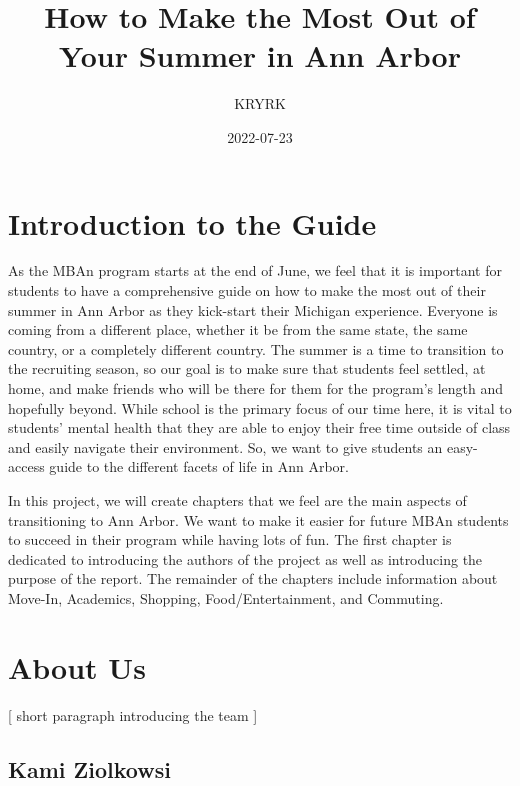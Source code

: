 \documentclass[
]{book}
\title{How to Make the Most Out of Your Summer in Ann Arbor}
\author{KRYRK}
\date{2022-07-23}
\begin{document}
\maketitle

{
\setcounter{tocdepth}{1}
\tableofcontents
}
\hypertarget{introduction-to-the-guide}{%
\chapter*{Introduction to the Guide}\label{introduction-to-the-guide}}

As the MBAn program starts at the end of June, we feel that it is important for students to have a comprehensive guide on how to make the most out of their summer in Ann Arbor as they kick-start their Michigan experience. Everyone is coming from a different place, whether it be from the same state, the same country, or a completely different country. The summer is a time to transition to the recruiting season, so our goal is to make sure that students feel settled, at home, and make friends who will be there for them for the program's length and hopefully beyond. While school is the primary focus of our time here, it is vital to students' mental health that they are able to enjoy their free time outside of class and easily navigate their environment. So, we want to give students an easy-access guide to the different facets of life in Ann Arbor.

In this project, we will create chapters that we feel are the main aspects of transitioning to Ann Arbor. We want to make it easier for future MBAn students to succeed in their program while having lots of fun. The first chapter is dedicated to introducing the authors of the project as well as introducing the purpose of the report. The remainder of the chapters include information about Move-In, Academics, Shopping, Food/Entertainment, and Commuting.

\hypertarget{about-us}{%
\chapter*{About Us}\label{about-us}}

{[} short paragraph introducing the team {]}

\hypertarget{kami-ziolkowsi}{%
\section{Kami Ziolkowsi}\label{kami-ziolkowsi}}
\end{document}
